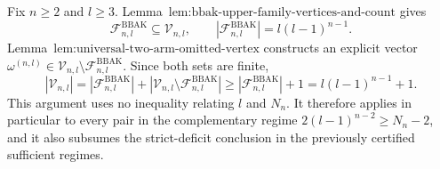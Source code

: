 Fix \(n\ge2\) and \(l\ge3\). Lemma~\(\text{lem:bbak-upper-family-vertices-and-count}\) gives
\[\mathcal F^{\mathrm{BBAK}}_{n,l}\subseteq\mathcal V_{n,l},\qquad |\mathcal F^{\mathrm{BBAK}}_{n,l}|=l(l-1)^{n-1}.\]
Lemma~\(\text{lem:universal-two-arm-omitted-vertex}\) constructs an explicit vector \(\omega^{(n,l)}\in\mathcal V_{n,l}\setminus\mathcal F^{\mathrm{BBAK}}_{n,l}\). Since both sets are finite,
\[|\mathcal V_{n,l}|=|\mathcal F^{\mathrm{BBAK}}_{n,l}|+|\mathcal V_{n,l}\setminus\mathcal F^{\mathrm{BBAK}}_{n,l}|\ge |\mathcal F^{\mathrm{BBAK}}_{n,l}|+1=l(l-1)^{n-1}+1.\]
This argument uses no inequality relating \(l\) and \(N_n\). It therefore applies in particular to every pair in the complementary regime \(2(l-1)^{n-2}\ge N_n-2\), and it also subsumes the strict-deficit conclusion in the previously certified sufficient regimes.